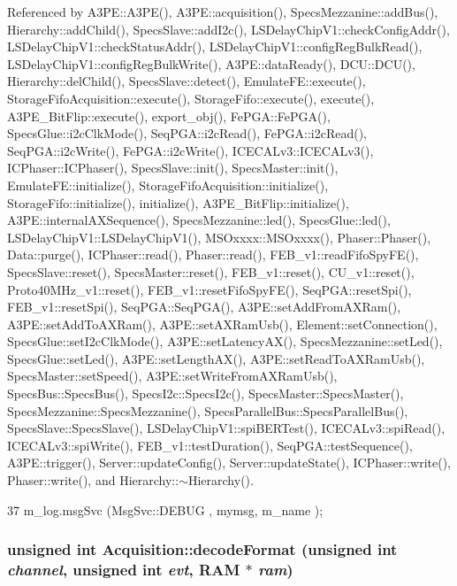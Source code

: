 Referenced by A3PE::A3PE(), A3PE::acquisition(), SpecsMezzanine::addBus(), Hierarchy::addChild(), SpecsSlave::addI2c(), LSDelayChipV1::checkConfigAddr(), LSDelayChipV1::checkStatusAddr(), LSDelayChipV1::configRegBulkRead(), LSDelayChipV1::configRegBulkWrite(), A3PE::dataReady(), DCU::DCU(), Hierarchy::delChild(), SpecsSlave::detect(), EmulateFE::execute(), StorageFifoAcquisition::execute(), StorageFifo::execute(), execute(), A3PE\_\-BitFlip::execute(), export\_\-obj(), FePGA::FePGA(), SpecsGlue::i2cClkMode(), SeqPGA::i2cRead(), FePGA::i2cRead(), SeqPGA::i2cWrite(), FePGA::i2cWrite(), ICECALv3::ICECALv3(), ICPhaser::ICPhaser(), SpecsSlave::init(), SpecsMaster::init(), EmulateFE::initialize(), StorageFifoAcquisition::initialize(), StorageFifo::initialize(), initialize(), A3PE\_\-BitFlip::initialize(), A3PE::internalAXSequence(), SpecsMezzanine::led(), SpecsGlue::led(), LSDelayChipV1::LSDelayChipV1(), MSOxxxx::MSOxxxx(), Phaser::Phaser(), Data::purge(), ICPhaser::read(), Phaser::read(), FEB\_\-v1::readFifoSpyFE(), SpecsSlave::reset(), SpecsMaster::reset(), FEB\_\-v1::reset(), CU\_\-v1::reset(), Proto40MHz\_\-v1::reset(), FEB\_\-v1::resetFifoSpyFE(), SeqPGA::resetSpi(), FEB\_\-v1::resetSpi(), SeqPGA::SeqPGA(), A3PE::setAddFromAXRam(), A3PE::setAddToAXRam(), A3PE::setAXRamUsb(), Element::setConnection(), SpecsGlue::setI2cClkMode(), A3PE::setLatencyAX(), SpecsMezzanine::setLed(), SpecsGlue::setLed(), A3PE::setLengthAX(), A3PE::setReadToAXRamUsb(), SpecsMaster::setSpeed(), A3PE::setWriteFromAXRamUsb(), SpecsBus::SpecsBus(), SpecsI2c::SpecsI2c(), SpecsMaster::SpecsMaster(), SpecsMezzanine::SpecsMezzanine(), SpecsParallelBus::SpecsParallelBus(), SpecsSlave::SpecsSlave(), LSDelayChipV1::spiBERTest(), ICECALv3::spiRead(), ICECALv3::spiWrite(), FEB\_\-v1::testDuration(), SeqPGA::testSequence(), A3PE::trigger(), Server::updateConfig(), Server::updateState(), ICPhaser::write(), Phaser::write(), and Hierarchy::$\sim$Hierarchy().


\begin{DoxyCode}
37 { m_log.msgSvc (MsgSvc::DEBUG   , mymsg, m_name ); }
\end{DoxyCode}
\hypertarget{classAcquisition_a76fe7c020f7097e5d479867ba783ba31}{
\subsubsection[{decodeFormat}]{\setlength{\rightskip}{0pt plus 5cm}unsigned int Acquisition::decodeFormat (unsigned int {\em channel}, \/  unsigned int {\em evt}, \/  {\bf RAM} $\ast$ {\em ram})}}
\label{classAcquisition_a76fe7c020f7097e5d479867ba783ba31}


